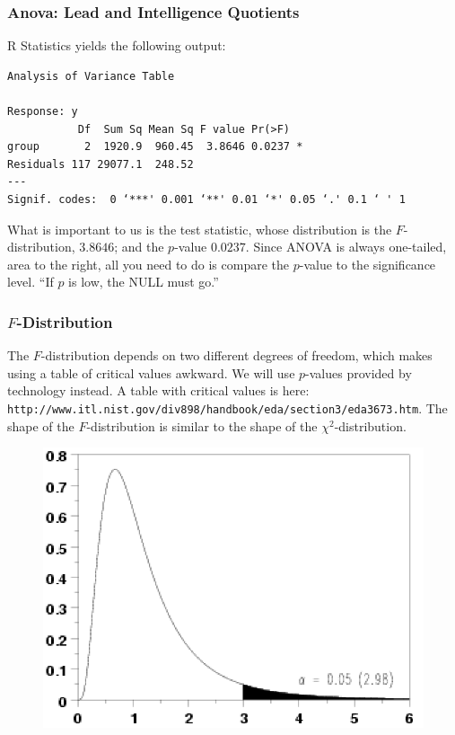 \documentclass[xcolor=dvipsnames]{beamer}
\begin{document}
\begin{frame}[fragile]
  \frametitle{Anova: Lead and Intelligence Quotients}
  R Statistics yields the following output:
\begin{verbatim}
Analysis of Variance Table

Response: y
           Df  Sum Sq Mean Sq F value Pr(>F)  
group       2  1920.9  960.45  3.8646 0.0237 *
Residuals 117 29077.1  248.52                 
---
Signif. codes:  0 ‘***' 0.001 ‘**' 0.01 ‘*' 0.05 ‘.' 0.1 ‘ ' 1
\end{verbatim}
What is important to us is the test statistic, whose distribution is
the $F$-distribution, $3.8646$; and the $p$-value $0.0237$. Since
ANOVA is always one-tailed, area to the right, all you need to do is
compare the $p$-value to the significance level. ``If $p$ is low, the
NULL must go.''
\end{frame}

\begin{frame}
  \frametitle{$F$-Distribution}
  The $F$-distribution depends on two different degrees of freedom,
  which makes using a table of critical values awkward. We will use
  $p$-values provided by technology instead. A
  table with critical values is here: {\footnotesize
    \texttt{http://www.itl.nist.gov/div898/handbook/eda/section3/eda3673.htm}}.
  The shape of the $F$-distribution is similar to the shape of the
  $\chi^{2}$-distribution.
\begin{figure}[h]
  \includegraphics[scale=0.25]{./diagrams/fdist.png}
\end{figure}
\end{frame}
\end{document}
